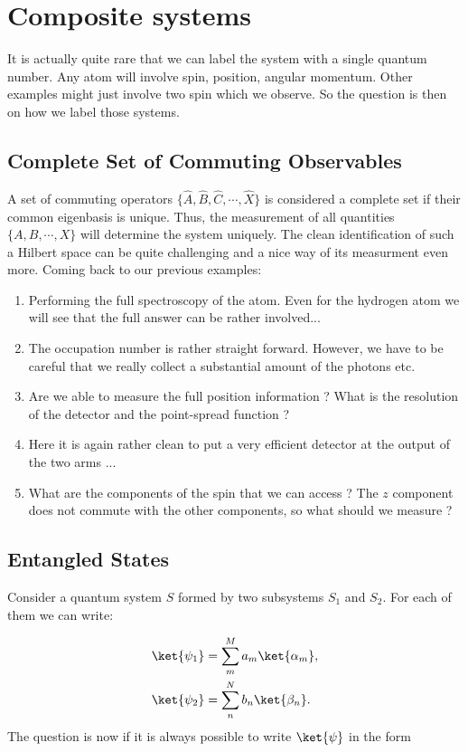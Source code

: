 \section{Composite systems}
It is actually quite rare that we can label the system with a single quantum number. Any atom will involve spin, position, angular momentum. Other examples might just involve two spin which we observe. So the question is then on how we label those systems. 

\subsection{Complete Set of Commuting Observables}

A set of commuting operators $\{\hat{A},\hat{B},\hat{C},\cdots,\hat{X}\}$ is considered a complete set if their common eigenbasis is unique. Thus, the measurement of all quantities $\{A,B,\cdots,X\}$ will determine the system uniquely. The clean identification of such a Hilbert space can be quite challenging and a nice way of its measurment even more. Coming back to our previous examples:

\begin{enumerate}
\item Performing the full spectroscopy of the atom. Even for the hydrogen atom we will see that the full answer can be rather involved...
\item The occupation number is rather straight forward. However, we have to be careful that we really collect a substantial amount of the photons etc.
\item Are we able to measure the full position information ? What is the resolution of the detector and the point-spread function ?
\item Here it is again rather clean to put a very efficient detector at the output of the two arms ...
\item What are the components of the spin that we can access ? The $z$ component does not commute with the other components, so what should we measure ?
\end{enumerate}

\subsection{Entangled States}
 
			Consider a quantum system $S$ formed by two subsystems $S_1$ and $S_2$. For each of them we can write:

\begin{align}
				\ket{\psi_1}&=\sum_m^M a_m \ket{\alpha_m},\\
				\ket{\psi_2}&=\sum_n^N b_n \ket{\beta_n}.
			
\end{align}
			The question is now if it is always possible to write $\ket{\psi}$ in the form

